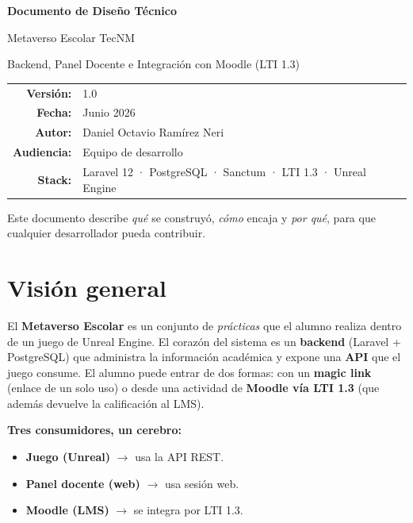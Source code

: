 \documentclass[11pt,letterpaper]{article}
\begin{document}
\begin{titlepage}
\centering
\vspace*{2.5cm}
{\Huge\bfseries\color{azultec} Documento de Diseño Técnico\par}
\vspace{0.6cm}
{\LARGE Metaverso Escolar TecNM\par}
\vspace{0.3cm}
{\large Backend, Panel Docente e Integración con Moodle (LTI 1.3)\par}
\vspace{2cm}
\begin{tabular}{rl}
\textbf{Versión:} & 1.0 \\[3pt]
\textbf{Fecha:} & Junio 2026 \\[3pt]
\textbf{Autor:} & Daniel Octavio Ramírez Neri \\[3pt]
\textbf{Audiencia:} & Equipo de desarrollo \\[3pt]
\textbf{Stack:} & Laravel 12 · PostgreSQL · Sanctum · LTI 1.3 · Unreal Engine \\
\end{tabular}
\vfill
{\small Este documento describe \emph{qué} se construyó, \emph{cómo} encaja y
\emph{por qué}, para que cualquier desarrollador pueda contribuir.\par}
\end{titlepage}

\tableofcontents
\clearpage

\section{Visión general}
El \textbf{Metaverso Escolar} es un conjunto de \emph{prácticas} que el alumno
realiza dentro de un juego de Unreal Engine. El corazón del sistema es un
\textbf{backend} (Laravel + PostgreSQL) que administra la información académica y
expone una \textbf{API} que el juego consume. El alumno puede entrar de dos
formas: con un \textbf{magic link} (enlace de un solo uso) o desde una actividad
de \textbf{Moodle vía LTI 1.3} (que además devuelve la calificación al LMS).

\textbf{Tres consumidores, un cerebro:}
\begin{itemize}[leftmargin=1.3em,nosep]
  \item \textbf{Juego (Unreal)} $\rightarrow$ usa la API REST.
  \item \textbf{Panel docente (web)} $\rightarrow$ usa sesión web.
  \item \textbf{Moodle (LMS)} $\rightarrow$ se integra por LTI 1.3.
\end{itemize}
\end{document}
